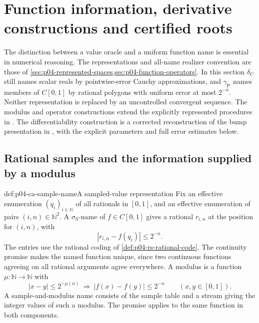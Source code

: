 \section{Function information, derivative constructions and certified roots}
\label{sec:p04-computable-real-analysis}

The distinction between a value oracle and a uniform function name is
essential in numerical reasoning. The representations and all-name
realizer convention are those of
\cref{sec:p04-represented-spaces,sec:p04-function-operators}.
In this section \(\delta_{\mathrm C}\) still names scalar reals by
pointwise-error Cauchy approximations, and \(\gamma_{\mathrm P}\)
names members of \(C[0,1]\) by rational polygons with uniform error
at most \(2^{-n}\). Neither representation is replaced by an
uncontrolled convergent sequence.
The modulus and operator constructions extend the explicitly represented
procedures in \cite[Theorems 6.4, 6.7, 6.9 and 7.7]{Weihrauch1995IntroductionRS}.
The differentiability construction is a corrected reconstruction of the bump presentation in
\cite[\S8.2, pp.\ 50--53]{Bournez2024ComputableAnalysisAuthor},
with the explicit parameters and full error estimates below.

\subsection{Rational samples and the information supplied by a modulus}
\label{sec:p04-ca-samples}

\begin{hbdefinition}{def:p04-ca-sample-name}{A sampled-value representation}
Fix an effective enumeration \((q_i)_{i\in\mathbb N}\) of all
rationals in \([0,1]\), and an effective enumeration of pairs
\((i,n)\in\mathbb N^2\). A \(\sigma_{\mathrm S}\)-name of
\(f\in C[0,1]\) gives a rational \(r_{i,n}\) at the position
for \((i,n)\), with
\[
 |r_{i,n}-f(q_i)|\leq2^{-n}.
\]
The entries use the rational coding of \cref{def:p04-rs-rational-code}.
The continuity promise makes the named function unique, since two
continuous functions agreeing on all rational arguments agree everywhere.
A modulus is a function \(\mu:\mathbb N\to\mathbb N\) with
\[
 |x-y|\leq2^{-\mu(n)}\ \Longrightarrow\
 |f(x)-f(y)|\leq2^{-n}\qquad(x,y\in[0,1]).
\]
A sample-and-modulus name consists of the sample table and a stream
giving the integer values of such a modulus. The promise applies to
the same function in both components.
\end{hbdefinition}

